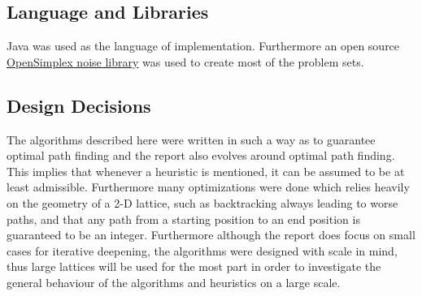\documentclass[conference]{IEEEtran}
\begin{document}
\subsection{Language and Libraries}
Java was used as the language of implementation. Furthermore an open source \href{https://gist.github.com/KdotJPG/b1270127455a94ac5d19}{OpenSimplex noise library} was used to create most of the problem sets.

\subsection{Design Decisions}
The algorithms described here were written in such a way as to guarantee optimal path finding and the report also evolves around optimal path finding. This implies that whenever a heuristic is mentioned, it can be assumed to be at least admissible. Furthermore many optimizations were done which relies heavily on the geometry of a 2-D lattice, such as backtracking always leading to worse paths, and that any path from a starting position to an end position is guaranteed to be an integer. Furthermore although the report does focus on small cases for iterative deepening, the algorithms were designed with scale in mind, thus large lattices will be used for the most part in order to investigate the general behaviour of the algorithms and heuristics on a large scale.
\end{document}
